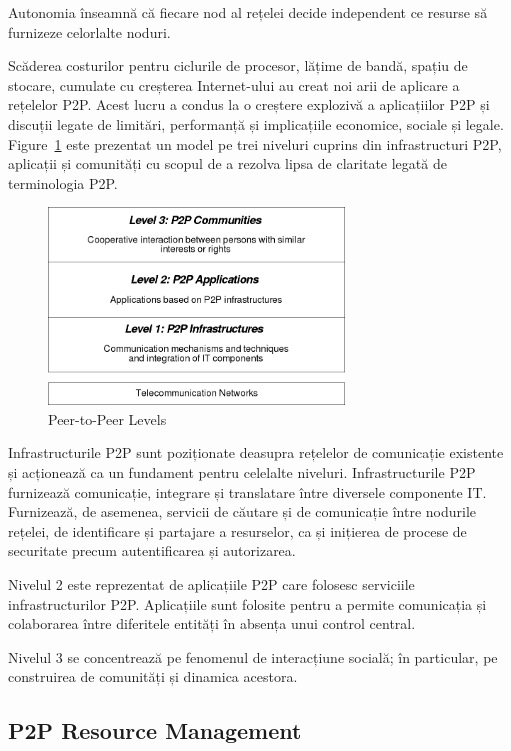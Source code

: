 Autonomia înseamnă că fiecare nod al rețelei decide independent ce resurse să
furnizeze celorlalte noduri.

Scăderea costurilor pentru ciclurile de procesor, lățime de bandă, spațiu de
stocare, cumulate cu creșterea Internet-ului au creat noi arii de aplicare a
rețelelor P2P. Acest lucru a condus la o creștere explozivă a aplicațiilor P2P
și discuții legate de limitări, performanță și implicațiile economice, sociale
și legale. Figure~\ref{fig:p2p-systems:p2p-levels} este prezentat un model pe
trei niveluri cuprins din infrastructuri P2P, aplicații și comunități cu
scopul de a rezolva lipsa de claritate legată de terminologia P2P.

\begin{figure}
  \centering
  \includegraphics[width=0.7\textwidth]{src/img/p2p-systems/p2p-levels}
  \caption{Peer-to-Peer Levels}
  \label{fig:p2p-systems:p2p-levels}
\end{figure}

Infrastructurile P2P sunt poziționate deasupra rețelelor de comunicație
existente și acționează ca un fundament pentru celelalte niveluri.
Infrastructurile P2P furnizează comunicație, integrare și translatare între
diversele componente IT. Furnizează, de asemenea, servicii de căutare și de
comunicație între nodurile rețelei, de identificare și partajare a resurselor,
ca și inițierea de procese de securitate precum autentificarea și autorizarea.

Nivelul 2 este reprezentat de aplicațiile P2P care folosesc serviciile
infrastructurilor P2P. Aplicațiile sunt folosite pentru a permite comunicația
și colaborarea între diferitele entități în absența unui control central.

Nivelul 3 se concentrează pe fenomenul de interacțiune socială; în particular,
pe construirea de comunități și dinamica acestora.

\subsection{P2P Resource Management}

